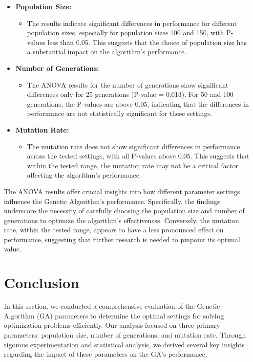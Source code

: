\documentclass[
]{article}
\begin{document}
    \begin{itemize}
        \item \textbf{Population Size:}
        \begin{itemize}
            \item The results indicate significant differences in performance for different population sizes, especially for population sizes 100 and 150, with P-values less than 0.05. This suggests that the choice of population size has a substantial impact on the algorithm's performance.
        \end{itemize}
        \item \textbf{Number of Generations:}
        \begin{itemize}
            \item The ANOVA results for the number of generations show significant differences only for 25 generations (P-value = 0.013). For 50 and 100 generations, the P-values are above 0.05, indicating that the differences in performance are not statistically significant for these settings.
        \end{itemize}
        \item \textbf{Mutation Rate:}
        \begin{itemize}
            \item The mutation rate does not show significant differences in performance across the tested settings, with all P-values above 0.05. This suggests that within the tested range, the mutation rate may not be a critical factor affecting the algorithm's performance.
        \end{itemize}
    \end{itemize}

    The ANOVA results offer crucial insights into how different parameter settings influence the Genetic Algorithm's performance. Specifically, the findings underscore the necessity of carefully choosing the population size and number of generations to optimize the algorithm's effectiveness. Conversely, the mutation rate, within the tested range, appears to have a less pronounced effect on performance, suggesting that further research is needed to pinpoint its optimal value.


    \section{Conclusion}

    In this section, we conducted a comprehensive evaluation of the Genetic Algorithm (GA) parameters to determine the optimal settings for solving optimization problems efficiently. Our analysis focused on three primary parameters: population size, number of generations, and mutation rate. Through rigorous experimentation and statistical analysis, we derived several key insights regarding the impact of these parameters on the GA's performance.
\end{document}

